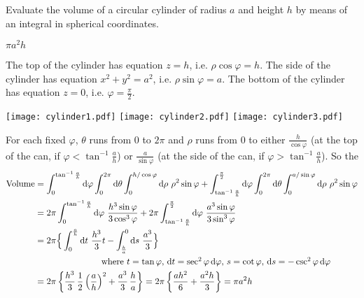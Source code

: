 \begin{question}
Evaluate the volume of a circular cylinder of radius $a$ and height $h$ by means of an integral in spherical coordinates.
\end{question}

%

\begin{answer}
$\pi a^2h$
\end{answer}

\begin{solution}
The top of the cylinder has equation $z=h$, i.e. $\rho\cos\varphi=h$.
The side of the cylinder has equation $x^2+y^2=a^2$, i.e. $\rho\sin\varphi=a$.
The bottom of the cylinder has equation $z=0$, i.e. $\varphi=\frac{\pi}{2}$.
\begin{center}
     \texttt{[image: cylinder1.pdf]}\qquad
     \texttt{[image: cylinder2.pdf]}\qquad
     \texttt{[image: cylinder3.pdf]}
\end{center}
For each fixed $\varphi$, $\theta$ runs from $0$ to $2\pi$ and $\rho$ 
runs from $0$
to either $\frac{h}{\cos\varphi}$ (at the top of the can,
if $\varphi<\tan^{-1}\frac{a}{h}$)
or $\frac{a}{\sin\varphi}$ (at the side of the can, if $\varphi>\tan^{-1}\frac{a}{h}$). So the
\begin{align*}
\text{Volume} 
&= \int_{0}^{\tan^{-1}{a\over h}} \mathrm{d}\varphi \int_{0}^{2\pi} \mathrm{d}\theta
\int_0^{h/\cos\varphi}\mathrm{d}\rho\ \rho^2\sin\varphi
+\int_{\tan^{-1}{a\over h}}^{{\pi\over 2}} \mathrm{d}\varphi \int_{0}^{2\pi} \mathrm{d}\theta
\int_0^{a/\sin\varphi}\mathrm{d}\rho\ \rho^2\sin\varphi \\
&= 2\pi\int_{0}^{\tan^{-1}{a\over h}} \mathrm{d}\varphi 
\ \frac{h^3\sin\varphi}{3\cos^3\varphi}
+2\pi\int_{\tan^{-1}{a\over h}}^{{\pi\over 2}} \mathrm{d}\varphi 
\ \frac{a^3\sin\varphi}{3\sin^3\varphi} \\
&=2\pi\Big\{\int_0^{{a\over h}}\mathrm{d}t\ \frac{h^3}{3}t
-\int^0_{{h\over a}}\mathrm{d}s\ \frac{a^3}{3}\Big\} \\
&\hskip1in\hbox{ where $t=\tan\varphi$, $\mathrm{d}t=\sec^2\varphi\,\mathrm{d}\varphi$,
$s=\cot\varphi$, $\mathrm{d}s=-\csc^2\varphi\,\mathrm{d}\varphi$} \\
&=2\pi\left\{\frac{h^3}{3}\,\frac{1}{2}\left(\frac{a}{h}\right)^2
+\frac{a^3}{3}\,\frac{h}{a}\right\}
=2\pi\left\{\frac{ah^2}{6}+\frac{a^2h}{3}\right\}
=\pi a^2h
\end{align*}
\end{solution}

